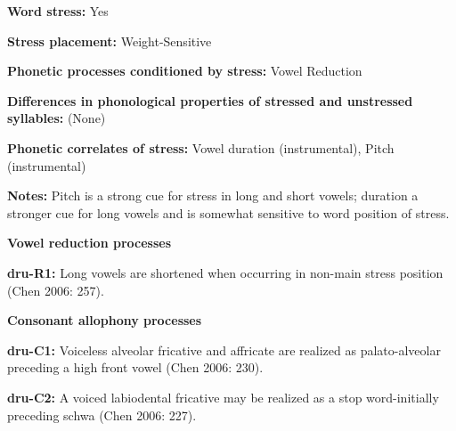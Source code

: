 \begin{styleBody}
\textbf{Word stress:} Yes
\end{styleBody}

\begin{styleBody}
\textbf{Stress placement:} Weight-Sensitive
\end{styleBody}

\begin{styleBody}
\textbf{Phonetic processes conditioned by stress:} Vowel Reduction
\end{styleBody}

\begin{styleBody}
\textbf{Differences in phonological properties of stressed and unstressed syllables:} (None)
\end{styleBody}

\begin{styleBody}
\textbf{Phonetic correlates of stress: }Vowel duration (instrumental), Pitch (instrumental)
\end{styleBody}

\begin{styleBody}
\textbf{Notes: }Pitch is a strong cue for stress in long and short vowels; duration a stronger cue for long vowels and is somewhat sensitive to word position of stress.
\end{styleBody}

\begin{styleBody}
\textbf{Vowel reduction processes}
\end{styleBody}

\begin{styleBody}
\textbf{dru-R1:} Long vowels are shortened when occurring in non-main stress position (Chen 2006: 257).
\end{styleBody}

\begin{styleBody}
\textbf{Consonant allophony processes}
\end{styleBody}

\begin{styleBody}
\textbf{dru-C1: }Voiceless alveolar fricative and affricate are realized as palato-alveolar preceding a high front vowel (Chen 2006: 230).
\end{styleBody}

\begin{styleBody}
\textbf{dru-C2: }A voiced labiodental fricative may be realized as a stop word-initially preceding schwa (Chen 2006: 227).
\end{styleBody}

